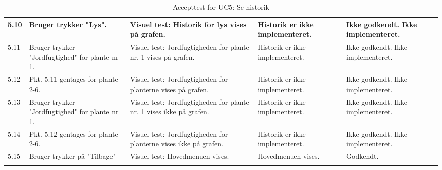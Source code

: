 \begin{longtable}{| l | >{\raggedright}X | >{\raggedright}X | >{\raggedright}X | >{\raggedright\arraybackslash}p{2.3cm} |}
    5.10 & Bruger trykker "Lys". & Visuel test: Historik for lys vises på grafen. & Historik er ikke implementeret. & Ikke godkendt. Ikke implementeret. \\ \hline
    5.11 & Bruger trykker "Jordfugtighed" for plante nr 1. & Visuel test: Jordfugtigheden for plante nr. 1 vises på grafen. & Historik er ikke implementeret. & Ikke godkendt. Ikke implementeret. \\ \hline
    5.12 & Pkt. 5.11 gentages for plante 2-6. &Visuel test: Jordfugtigheden for planterne vises på grafen. & Historik er ikke implementeret. & Ikke godkendt. Ikke implementeret.\\\hline
    5.13 & Bruger trykker "Jordfugtighed" for plante nr 1.  & Visuel test: Jordfugtigheden for plante nr. 1 vises ikke på grafen. & Historik er ikke implementeret. & Ikke godkendt. Ikke implementeret. \\ \hline
    5.14 & Pkt. 5.12 gentages for plante 2-6. &Visuel test: Jordfugtigheden for planterne vises ikke på grafen. & Historik er ikke implementeret. & Ikke godkendt. Ikke implementeret. \\\hline
    5.15 & Bruger trykker på "Tilbage" & Visuel test: Hovedmenuen vises. & Hovedmenuen vises. & Godkendt. \\ \hline
	\caption{Accepttest for UC5: Se historik}\label{tbl:acceptUC5}
\end{longtable}